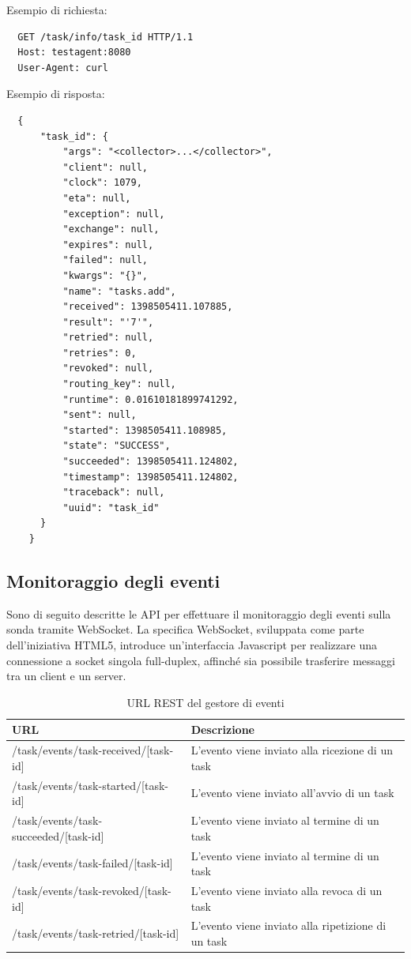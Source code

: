 \documentclass[../main.tex]{subfiles}
\begin{document}
Esempio di richiesta:
\begin{Verbatim}
  GET /task/info/task_id HTTP/1.1
  Host: testagent:8080
  User-Agent: curl
\end{Verbatim}


Esempio di risposta:
\begin{Verbatim}
  {
      "task_id": {
          "args": "<collector>...</collector>",
          "client": null,
          "clock": 1079,
          "eta": null,
          "exception": null,
          "exchange": null,
          "expires": null,
          "failed": null,
          "kwargs": "{}",
          "name": "tasks.add",
          "received": 1398505411.107885,
          "result": "'7'",
          "retried": null,
          "retries": 0,
          "revoked": null,
          "routing_key": null,
          "runtime": 0.01610181899741292,
          "sent": null,
          "started": 1398505411.108985,
          "state": "SUCCESS",
          "succeeded": 1398505411.124802,
          "timestamp": 1398505411.124802,
          "traceback": null,
          "uuid": "task_id"
      }
    }
\end{Verbatim}

\subsection{Monitoraggio degli eventi}
Sono di seguito descritte le API per effettuare il monitoraggio degli eventi sulla sonda tramite WebSocket.
La specifica WebSocket, sviluppata come parte dell'iniziativa HTML5, introduce un'interfaccia Javascript per realizzare una connessione a socket singola full-duplex, affinché sia possibile trasferire messaggi tra un client e un server\cite{WebSocket}.
\begin{table}[h]
\centering
\begin{tabular}{| m{4.4cm}| m{5cm} | }
\hline
\textbf{URL} & \textbf{Descrizione} \\ \hline
/task/events/task-received/[task-id] & L'evento viene inviato alla ricezione di un task\\ \hline
/task/events/task-started/[task-id] & L'evento viene inviato all'avvio di un task\\ \hline
/task/events/task-succeeded/[task-id] & L'evento viene inviato al termine di un task\\ \hline
/task/events/task-failed/[task-id]  & L'evento viene inviato al termine di un task\\ \hline
/task/events/task-revoked/[task-id] & L'evento viene inviato alla revoca di un task\\ \hline
/task/events/task-retried/[task-id] & L'evento viene inviato alla ripetizione di un task\\ \hline
\end{tabular}
\caption{URL REST del gestore di eventi}
\label{tab:events urls}
\end{table}
\end{document}
